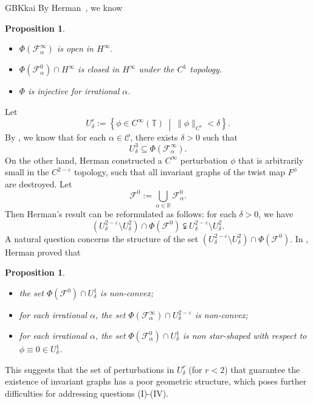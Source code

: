 \documentclass{amsart}
\newcommand{\al}{\alpha}
\newcommand{\eps}{\varepsilon}
\newtheorem{Proposition}[Definition]{Proposition}
\theoremstyle{definition}
\begin{document}
\begin{CJK*}{GBK}{kai}
	By Herman~\cite[Chapter II]{H1}, we know
\begin{Proposition}\label{Hp123}
\
\begin{itemize}
\item [(i)] \( \Phi(\mathcal{F}_\al^\infty) \) is open in \( {H}^\infty \).
\item [(ii)] $\Phi(\mathcal{F}_\al^0)\cap H^\infty$ is closed in $H^\infty$ under the $C^1$ topology.
\item [(iii)] \( \Phi \) is injective for irrational \( \alpha \).
\end{itemize}
\end{Proposition}	
		Let
		\[
		U^r_\delta := \left\{ \phi \in C^\infty(\mathbb{T})\ \middle|\ \|\phi\|_{C^{r}} < \delta \right\}.
		\]
		By \cite[Corollary 7.10]{H33}, we know that for each $\alpha \in \mathcal{C}$, there exists $\delta > 0$ such that
		\begin{equation}\label{hkam}
			U_\delta^3 \subseteq \Phi(\mathcal{F}_\alpha^\infty).
		\end{equation}
		On the other hand, Herman \cite[Theorem 3.3]{H1} constructed a $C^\infty$ perturbation $\phi$ that is arbitrarily small in the $C^{2 - \varepsilon}$ topology, such that all invariant graphs of the  twist map $F^\phi$ are destroyed. Let
		\[
		\mathcal{F}^0 := \bigcup_{\alpha \in \mathbb{R}} \mathcal{F}_\alpha^0.
		\]
		Then Herman's result can be reformulated as follows: for each $\delta > 0$, we have
		\begin{equation}\label{hckam1}
			(U_\delta^{2 - \varepsilon} \setminus U_\delta^2) \cap \Phi(\mathcal{F}^0) \subsetneqq U_\delta^{2 - \varepsilon} \setminus U_\delta^2.
		\end{equation}
		A natural question concerns the structure of the set $(U_\delta^{2 - \varepsilon} \setminus U_\delta^2) \cap \Phi(\mathcal{F}^0)$. In \cite[Chapter III]{H1}, Herman proved  that
\begin{Proposition}\label{Hpiii}
\
		\begin{itemize}
			\item the set $\Phi(\mathcal{F}^0)\cap U_\delta^{1}$ is non-convex;
			\item for each irrational $\al$, the set $\Phi(\mathcal{F}^\infty_\al)\cap U_\delta^{2-\eps}$ is non-convex;
			\item for each irrational $\al$, the set $\Phi(\mathcal{F}^0_\al)\cap U_\delta^{1}$ is non star-shaped with respect to $\phi\equiv 0\in U_\delta^{1}$.
		\end{itemize}
\end{Proposition}
		This suggests that the set of perturbations in $U_\delta^{r}$ (for $r<2$) that guarantee the existence of invariant graphs has a poor geometric structure, which poses further difficulties for addressing questions (I)-(IV).
		

\end{CJK*}
\end{document}
